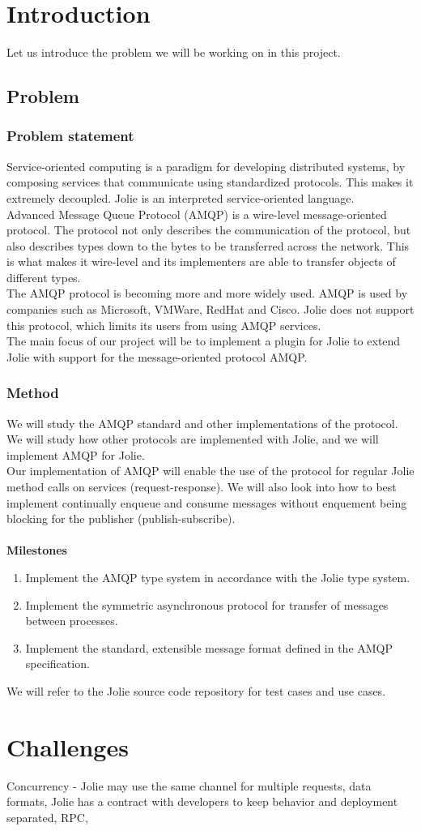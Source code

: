 \section{Introduction}
Let us introduce the problem we will be working on in this project.
\subsection{Problem}
\subsubsection{Problem statement}
Service-oriented computing is a paradigm for developing distributed systems, by composing services that communicate using standardized protocols. This makes it extremely decoupled. Jolie is an interpreted service-oriented language.\\
Advanced Message Queue Protocol (AMQP) is a wire-level message-oriented protocol. The protocol not only describes the communication of the protocol, but also describes types down to the bytes to be transferred across the network. This is what makes it wire-level and its implementers are able to transfer objects of different types.\\
The AMQP protocol is becoming more and more widely used. AMQP is used by companies such as Microsoft, VMWare, RedHat and Cisco. Jolie does not support this protocol, which limits its users from using AMQP services.\\
The main focus of our project will be to implement a plugin for Jolie to extend Jolie with support for the message-oriented protocol AMQP.
\subsubsection{Method}
We will study the AMQP standard and other implementations of the protocol. We will study how other protocols are implemented with Jolie, and we will implement AMQP for Jolie.\\
Our implementation of AMQP will enable the use of the protocol for regular Jolie method calls on services (request-response). We will also look into how to best implement continually enqueue and consume messages without enquement being blocking for the publisher (publish-subscribe).\\
\\\textbf{Milestones}
\begin{enumerate}
\item Implement the AMQP type system in accordance with the Jolie type system.
\item Implement the symmetric asynchronous protocol for transfer of messages between processes.
\item Implement the standard, extensible message format defined in the AMQP specification.
\end{enumerate}

We will refer to the Jolie source code repository for test cases and use cases.
\section{Challenges}
Concurrency - Jolie may use the same channel for multiple requests, data formats, Jolie has a contract with developers to keep behavior and deployment separated, RPC,
\newpage